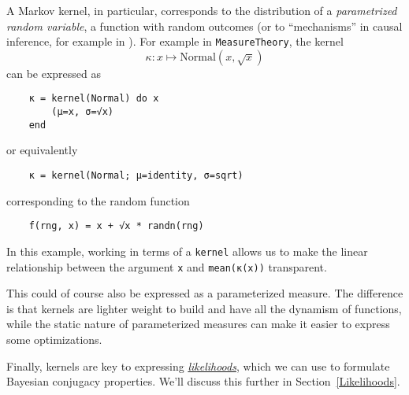 \documentclass{juliacon}
\newcommand{\chad}[2][] {\todo[inline,backgroundcolor=orange!20!white, size=\footnotesize,#1]{(Chad) #2 }}
\newcommand{\moritz}[2][] {\todo[inline,backgroundcolor=blue!10!white, size=\footnotesize,#1]{(Moritz) #2 }}
\begin{document}
A Markov kernel, in particular, corresponds to the distribution of a \emph{parametrized random variable}, a function with random outcomes (or to ``mechanisms'' in causal inference, for example in \cite{https://doi.org/10.5281/zenodo.1005091}). For example in \verb|MeasureTheory|, the kernel
\[
\kappa\colon x \mapsto \text{Normal}(x,\sqrt{x})
\]
can be expressed as
\begin{verbatim}
    κ = kernel(Normal) do x
        (μ=x, σ=√x)
    end
\end{verbatim}
or equivalently
\begin{verbatim}
    κ = kernel(Normal; μ=identity, σ=sqrt)
\end{verbatim}
corresponding to the random function
\begin{verbatim}
    f(rng, x) = x + √x * randn(rng)
\end{verbatim}

In this example, working in terms of a \verb|kernel| allows us to make the linear relationship between the argument \verb|x| and \verb|mean(κ(x))| transparent. 

This could of course also be expressed as a parameterized measure. The difference is that kernels are lighter weight to build and have all the dynamism of functions, while the static nature of parameterized measures can make it easier to express some optimizations.


Finally, kernels are key to expressing \href{https://en.wikipedia.org/wiki/Likelihood_function}{\emph{likelihoods}}, which we can use to formulate Bayesian conjugacy properties. We'll discuss this further in Section~\ref{Likelihoods}.



\end{document}
